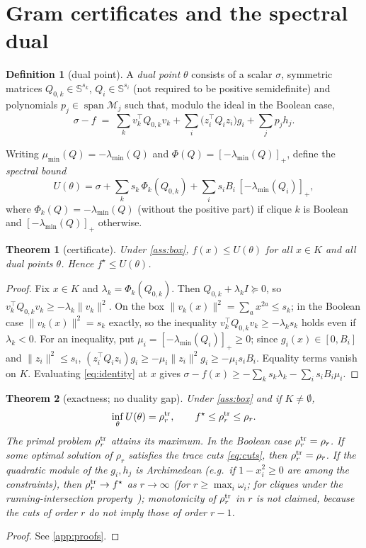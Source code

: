\documentclass[a4paper,11pt]{article}
\theoremstyle{plain}
\newtheorem{theorem}{Theorem}
\theoremstyle{definition}
\newtheorem{definition}{Definition}
\theoremstyle{remark}
\newcommand{\Sym}{\mathbb{S}}
\newcommand{\lmin}{\lambda_{\min}}
\newcommand{\pos}[1]{[#1]_+}
\begin{document}
\section{Gram certificates and the spectral dual}\label{sec:dual}
\begin{definition}[dual point]\label{def:theta}
A \emph{dual point} $\theta$ consists of a scalar $\sigma$, symmetric matrices $Q_{0,k}\in\Sym^{s_k}$, $Q_i\in\Sym^{s_i}$ (not required to be positive semidefinite) and polynomials $p_j\in\operatorname{span}\mathcal M_j$ such that, modulo the ideal in the Boolean case,
\begin{equation}\label{eq:identity}
\sigma-f \;=\; \sum_{k}v_k^\top Q_{0,k}v_k+\sum_{i}\big(z_i^\top Q_iz_i\big)g_i+\sum_jp_jh_j .
\end{equation}
\end{definition}
Writing $\mu_{\min}(Q)=-\lmin(Q)$ and $\Phi(Q)=\pos{-\lmin(Q)}$, define the \emph{spectral bound}
\begin{equation}\label{eq:U}
U(\theta)=\sigma+\sum_ks_k\,\Phi_k(Q_{0,k})+\sum_is_iB_i\,\pos{-\lmin(Q_i)},
\end{equation}
where $\Phi_k(Q)=-\lmin(Q)$ (without the positive part) if clique $k$ is Boolean and $\pos{-\lmin(Q)}$ otherwise.

\begin{theorem}[certificate]\label{thm:certificate}
Under \cref{ass:box}, $f(x)\le U(\theta)$ for all $x\in K$ and all dual points $\theta$. Hence $f^\star\le U(\theta)$.
\end{theorem}
\begin{proof}
Fix $x\in K$ and $\lambda_k=\Phi_k(Q_{0,k})$. Then $Q_{0,k}+\lambda_kI\succeq0$, so $v_k^\top Q_{0,k}v_k\ge-\lambda_k\|v_k\|^2$. On the box $\|v_k(x)\|^2=\sum_a x^{2a}\le s_k$; in the Boolean case $\|v_k(x)\|^2=s_k$ exactly, so the inequality $v_k^\top Q_{0,k}v_k\ge-\lambda_ks_k$ holds even if $\lambda_k<0$. For an inequality, put $\mu_i=\pos{-\lmin(Q_i)}\ge0$; since $g_i(x)\in[0,B_i]$ and $\|z_i\|^2\le s_i$, $(z_i^\top Q_iz_i)g_i\ge-\mu_i\|z_i\|^2g_i\ge-\mu_is_iB_i$. Equality terms vanish on $K$. Evaluating \eqref{eq:identity} at $x$ gives $\sigma-f(x)\ge-\sum_ks_k\lambda_k-\sum_is_iB_i\mu_i$.
\end{proof}

\begin{theorem}[exactness; no duality gap]\label{thm:exact}
Under \cref{ass:box} and if $K\ne\emptyset$,
\[
\inf_\theta U(\theta)=\rho_r^{\rm tr},\qquad f^\star\le\rho_r^{\rm tr}\le\rho_r .
\]
The primal problem $\rho_r^{\rm tr}$ attains its maximum. In the Boolean case $\rho_r^{\rm tr}=\rho_r$. If some optimal solution of $\rho_r$ satisfies the trace cuts \eqref{eq:cuts}, then $\rho_r^{\rm tr}=\rho_r$. If the quadratic module of the $g_i,h_j$ is Archimedean (e.g.\ if $1-x_i^2\ge0$ are among the constraints), then $\rho_r^{\rm tr}\to f^\star$ as $r\to\infty$ (for $r\ge\max_i\omega_i$; for cliques under the running-intersection property~\cite{lasserre2006}); monotonicity of $\rho_r^{\rm tr}$ in $r$ is not claimed, because the cuts of order $r$ do not imply those of order $r-1$.
\end{theorem}
\begin{proof}
See \cref{app:proofs}.
\end{proof}
\end{document}
